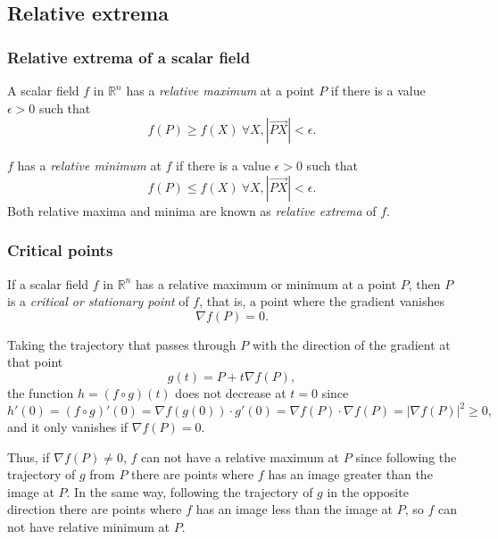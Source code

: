 % 
% 
\subsection{Relative extrema}
\begin{frame}
\frametitle{Relative extrema of a scalar field}
\begin{definition}
A scalar field $f$ in $\mathbb{R}^n$ has a \emph{relative maximum} at a point $P$ if there is a value $\epsilon>0$ such that 
\[
f(P)\geq f(X)\ \forall X, |\vec{PX}|<\epsilon.
\]

$f$ has a \emph{relative minimum} at $f$ if there is a value $\epsilon>0$ such that
\[
f(P)\leq f(X)\ \forall X, |\vec{PX}|<\epsilon.
\]
Both relative maxima and minima are known as \emph{relative extrema} of $f$.
\end{definition}
\end{frame}


\begin{frame}
\frametitle{Critical points}
\begin{theorem}
If a scalar field $f$ in $\mathbb{R}^n$ has a relative maximum or minimum at a point $P$, then $P$ is a \emph{critical or stationary point} of $f$, that is, a point where the gradient vanishes
\[
\nabla f(P) = 0.
\]
\end{theorem}

Taking the trajectory that passes through $P$ with the direction of the gradient at that point
\[
g(t)=P+t\nabla f(P),
\]
the function $h=(f\circ g)(t)$ does not decrease at $t=0$ since
\[
h'(0)= (f\circ g)'(0) = \nabla f(g(0))\cdot g'(0) = \nabla f(P)\cdot \nabla f(P) = |\nabla f(P)|^2\geq 0,
\]
and it only vanishes if $\nabla f(P)=0$.

Thus, if $\nabla f(P)\neq 0$, $f$ can not have a relative maximum at $P$ since following the trajectory of $g$ from $P$ there are points where $f$ has an image greater than the image at $P$.
In the same way, following the trajectory of $g$ in the opposite direction there are points where $f$ has an image less than the image at $P$, so $f$ can not have relative minimum at $P$. 
\end{frame}


